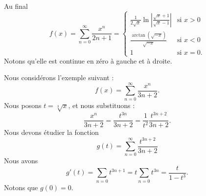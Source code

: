 \begin{example}
    Au final
    \begin{equation}        \label{EqIHlDjG}
        f(x)=\sum_{n=0}^{\infty}\frac{ x^n }{ 2n+1 }=\begin{cases}
            \frac{ 1 }{2\sqrt{x}}\ln\left| \frac{ \sqrt{x}+1 }{ \sqrt{x}-1 } \right|     &   \text{si } x>0\\
            \frac{ \arctan(\sqrt{-x}) }{ \sqrt{-x} }    &    \text{si } x<0\\
            1   &\text{si } x=0.
        \end{cases}
    \end{equation}
    Notons qu'elle est continue en zéro à gauche et à droite.

\end{example}

\begin{example}
Nous considérons l'exemple suivant :
\begin{equation}
    f(x)=\sum_{n=0}^{\infty}\frac{ x^n }{ 3n+2 }.
\end{equation}
Nous posons \( t=\sqrt[3]{x}\), et nous substituons :
\begin{equation}
    \frac{ x^n }{ 3n+2 }=\frac{ t^{3n} }{ 3n+2 }=\frac{1}{ t^2 }\frac{ t^{3n+2} }{ 3n+2 }.
\end{equation}
Nous devons étudier la fonction
\begin{equation}
    g(t)=\sum_{n=0}^{\infty}\frac{ t^{3n+2} }{ 3n+2 }
\end{equation}
Nous avons
\begin{equation}
    g'(t)=\sum_{n=0}t^{3n+1}=t\sum_{n=0}t^{3n}=\frac{ t }{ 1-t^3 }.
\end{equation}
Notons que \( g(0)=0\).
\end{example}

